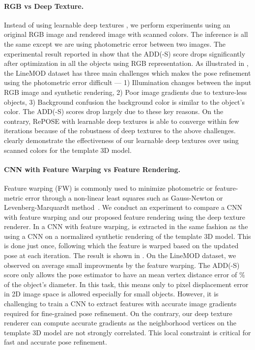 \documentclass[10pt,twocolumn,letterpaper]{article}
\begin{document}
\paragraph{RGB vs Deep Texture.}
Instead of using learnable deep textures , we perform experiments using an original RGB image and rendered image with scanned colors. The inference is all the same except we are using photometric error between two images.
The experimental result reported in   show that the ADD(-S) score drops significantly after optimization in all the objects using RGB representation. As illustrated in , the LineMOD dataset has three main challenges which makes the pose refinement using the photometric error difficult --- 1) Illumination changes between the input RGB image and synthetic rendering, 2) Poor image gradients due to texture-less objects, 3) Background confusion \ie the background color is similar to the object's color.
The ADD(-S) scores drop largely due to these key reasons.
On the contrary, RePOSE with learnable deep textures is able to converge within few iterations because of the robustness of deep textures to the above challenges.
 clearly demonstrate the effectiveness of our learnable deep textures over using scanned colors for the template 3D model.

\paragraph{CNN with Feature Warping vs Feature Rendering.}
Feature warping (FW) is commonly used to minimize photometric or feature-metric error through a non-linear least squares such as Gauss-Newton or Levenberg-Marquardt method~\cite{10.1007/978-3-642-15552-9_3,Triggs:1999:BAM:646271.685629}.
We conduct an experiment to compare a CNN with feature warping and our proposed feature rendering using the deep texture renderer.
In a CNN with feature warping,  is extracted in the same fashion as the  using a CNN on a normalized synthetic rendering of the template 3D model. This is done just once, following which the feature is warped based on the updated pose at each iteration.
The result is shown in .
On the LineMOD dataset, we observed on average small improvments by the feature warping. The ADD(-S) score only allows the pose estimator to have an mean vertex distance error of \% of the object's diameter. In this task, this means only  to  pixel displacement error in 2D image space is allowed especially for small objects. However, it is challenging to train a CNN to extract features with accurate image gradients required for fine-grained pose refinement.
On the contrary, our deep texture renderer can compute accurate gradients as the neighborhood vertices on the template 3D model are not strongly correlated.
This local constraint is critical for fast and accurate pose refinement.
\end{document}
